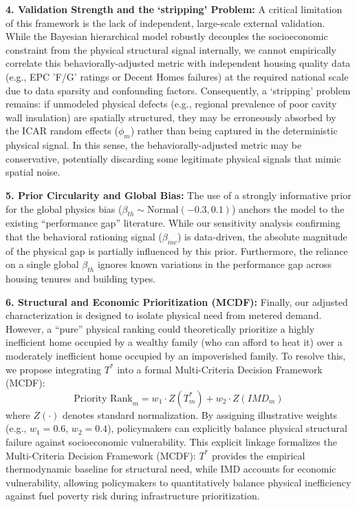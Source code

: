 \documentclass[11pt, a4paper, twocolumn]{article}
\begin{document}
\textbf{4. Validation Strength and the `stripping' Problem:} A critical limitation of this framework is the lack of independent, large-scale external validation. While the Bayesian hierarchical model robustly decouples the socioeconomic constraint from the physical structural signal internally, we cannot empirically correlate this behaviorally-adjusted metric with independent housing quality data (e.g., EPC 'F/G' ratings or Decent Homes failures) at the required national scale due to data sparsity and confounding factors. Consequently, a `stripping' problem remains: if unmodeled physical defects (e.g., regional prevalence of poor cavity wall insulation) are spatially structured, they may be erroneously absorbed by the ICAR random effects (\(\phi_m\)) rather than being captured in the deterministic physical signal. In this sense, the behaviorally-adjusted metric may be conservative, potentially discarding some legitimate physical signals that mimic spatial noise.

\textbf{5. Prior Circularity and Global Bias:} The use of a strongly
informative prior for the global physics bias
(\(\beta_{th} \sim \text{Normal}(-0.3, 0.1)\)) anchors the model to the
existing ``performance gap'' literature. While our sensitivity analysis
confirming that the behavioral rationing signal (\(\beta_{inc}\)) is
data-driven, the absolute magnitude of the physical gap is partially
influenced by this prior. Furthermore, the reliance on a single global
\(\beta_{th}\) ignores known variations in the performance gap across
housing tenures and building types.

\textbf{6. Structural and Economic Prioritization (MCDF):} Finally, our adjusted characterization is designed to 
isolate physical need from metered demand. However, a ``pure'' physical 
ranking could theoretically prioritize a highly inefficient home 
occupied by a wealthy family (who can afford to heat it) over a 
moderately inefficient home occupied by an impoverished family. To resolve this, we propose integrating \(T^*\) into a formal Multi-Criteria Decision Framework (MCDF):
\begin{equation}
\text{Priority Rank}_m = w_1 \cdot Z(T^*_m) + w_2 \cdot Z(IMD_m)
\end{equation}
where \(Z(\cdot)\) denotes standard normalization. By assigning illustrative weights (e.g., \(w_1 = 0.6\), \(w_2 = 0.4\)), policymakers can explicitly balance physical structural failure against socioeconomic vulnerability. This explicit linkage formalizes the Multi-Criteria Decision Framework (MCDF): $T^*$ provides the empirical thermodynamic baseline for structural need, while IMD accounts for economic vulnerability, allowing policymakers to quantitatively balance physical inefficiency against fuel poverty risk during infrastructure prioritization.
\end{document}
